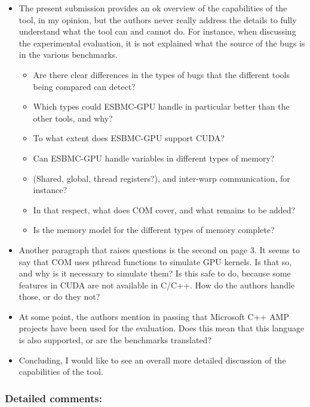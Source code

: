 \documentclass[12pt]{article}
\begin{document}
\begin{itemize}
\item The present submission provides an ok overview of the capabilities of the tool, in my opinion, but the authors never really address the details to fully understand what the tool can and cannot do. For instance, when discussing the experimental evaluation, it is not explained what the source of the bugs is in the various benchmarks.
  \begin{itemize}
  \item Are there clear differences in the types of bugs that the different tools being compared can detect?
  \item Which types could ESBMC-GPU handle in particular better than the other tools, and why?
  \item To what extent does ESBMC-GPU support CUDA?
  \item Can ESBMC-GPU handle variables in different types of memory?
  \item (Shared, global, thread registers?), and inter-warp communication, for instance?
  \item In that respect, what does COM cover, and what remains to be added?
  \item Is the memory model for the different types of memory complete?
  \end{itemize}

\item Another paragraph that raises questions is the second on page 3. It seems to say that COM uses pthread functions to simulate GPU kernels. Is that so, and why is it necessary to simulate them? Is this safe to do, because some features in CUDA are not available in C/C++. How do the authors handle those, or do they not?

\item At some point, the authors mention in passing that Microsoft C++ AMP projects have been used for the evaluation. Does this mean that this language is also supported, or are the benchmarks translated?

\item Concluding, I would like to see an overall more detailed discussion of the capabilities of the tool.

\end{itemize}

\subsubsection{Detailed comments:}
\end{document}
